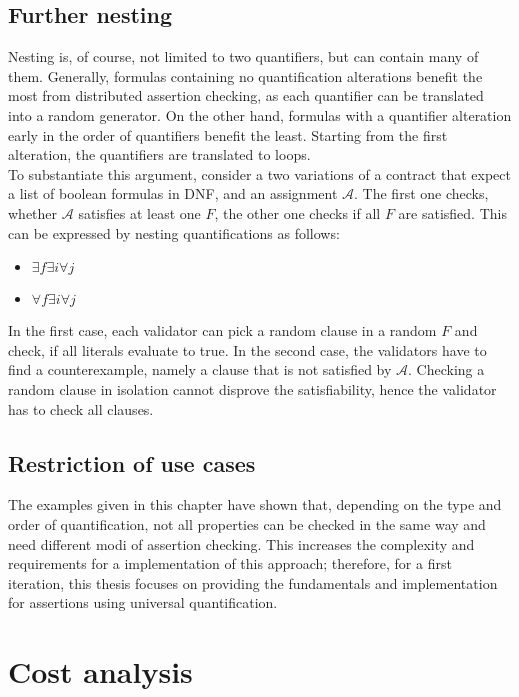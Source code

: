 \subsection{Further nesting}
Nesting is, of course, not limited to two quantifiers, but can contain many of them. Generally, formulas containing no quantification alterations benefit the most from distributed assertion checking, as each quantifier can be translated into a random generator. On the other hand, formulas with a quantifier alteration early in the order of quantifiers benefit the least. Starting from the first alteration, the quantifiers are translated to loops.\\
To substantiate this argument, consider a two variations of a contract that expect a list of boolean formulas in DNF, and an assignment $\mathcal{A}$. The first one checks, whether $\mathcal{A}$ satisfies at least one $F$, the other one checks if all $F$ are satisfied. This can be expressed by nesting quantifications as follows: 
\begin{itemize}
\item $\exists f \exists i \forall j$
\item $\forall f \exists i \forall j$
\end{itemize}
In the first case, each validator can pick a random clause in a random $F$ and check, if all literals evaluate to true. In the second case, the validators have to find a counterexample, namely a clause that is not satisfied by $\mathcal{A}$. Checking a random clause in isolation cannot disprove the satisfiability, hence the validator has to check all clauses.

\subsection{Restriction of use cases} %
The examples given in this chapter have shown that, depending on the type and order of quantification, not all properties can be checked in the same way and need different modi of assertion checking. This increases the complexity and requirements for a implementation of this approach; therefore, for a first iteration, this thesis focuses on providing the fundamentals and implementation for assertions using universal quantification.

\section{Cost analysis} 

